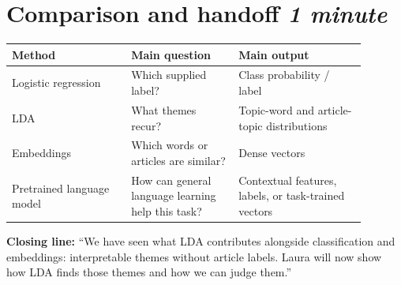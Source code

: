 \documentclass[11pt]{article}
\begin{document}
\clearpage
\section*{Comparison and handoff \hfill\normalsize\textit{1 minute}}

\begin{center}
\begin{tabular}{@{}p{0.30\linewidth}p{0.27\linewidth}p{0.32\linewidth}@{}}
\toprule
Method & Main question & Main output \\
\midrule
Logistic regression & Which supplied label? & Class probability / label \\
LDA & What themes recur? & Topic-word and article-topic distributions \\
Embeddings & Which words or articles are similar? & Dense vectors \\
Pretrained language model & How can general language learning help this task? & Contextual features, labels, or task-trained vectors \\
\bottomrule
\end{tabular}
\end{center}

\textbf{Closing line:} ``We have seen what LDA contributes alongside classification and embeddings: interpretable themes without article labels. Laura will now show how LDA finds those themes and how we can judge them.''

\printbibliography[title={References}]
\end{document}

